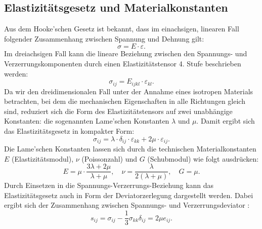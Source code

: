 \subsection{Elastizitätsgesetz und Materialkonstanten}
Aus dem Hooke’schen Gesetz ist bekannt, dass im einachsigen, linearen Fall folgender Zusammenhang zwischen Spannung und Dehnung gilt:
\begin{equation}
	\sigma = 
	E \cdot \varepsilon.
\end{equation}
Im dreiachsigen Fall kann die lineare Beziehung zwischen den Spannungs- und Verzerrungskomponenten durch einen Elastizitätstensor 4. Stufe beschrieben werden:
\begin{equation}
	\sigma_{ij} = 
	E_{ijkl} \cdot \varepsilon_{kl}.
\end{equation}
Da wir den dreidimensionalen Fall unter der Annahme eines isotropen Materials betrachten, bei dem die mechanischen Eigenschaften in alle Richtungen gleich sind, reduziert sich die Form des Elastizitätstensors auf zwei unabhängige Konstanten: die sogenannten Lame’schen Konstanten $\lambda$ und $\mu$. 
Damit ergibt sich das Elastizitätsgesetz in kompakter Form:
\begin{equation}
	\sigma_{ij} = 
	\lambda \cdot \delta_{ij} \cdot \varepsilon_{kk} + 2\mu \cdot \varepsilon_{ij}.
\end{equation}
Die Lame’schen Konstanten lassen sich durch die technischen Materialkonstanten $E$ (Elastizitätsmodul), $\nu$ (Poissonzahl) und $G$ (Schubmodul) wie folgt ausdrücken:
\begin{equation}
	E = 
	\mu \cdot \frac{3\lambda + 2\mu}{\lambda + \mu}, \quad 
	\nu = 
	\frac{\lambda}{2(\lambda + \mu)}, \quad 
	G = 
	\mu.
\end{equation}
Durch Einsetzen in die Spannungs-Verzerrungs-Beziehung kann das Elastizitätsgesetz auch in Form der Deviatorzerlegung dargestellt werden. 
Dabei ergibt sich der Zusammenhang zwischen Spannungs- und Verzerrungsdeviator \cite{elastomechanik:Grundlagen_der_Elastizitaetstheorie}:
\begin{equation}
	s_{ij} = 
	\sigma_{ij} - \frac{1}{3} \sigma_{kk} \delta_{ij} = 
	2\mu e_{ij}.
\end{equation}